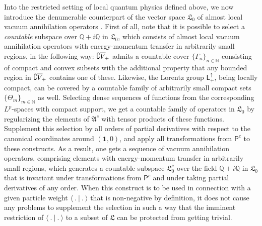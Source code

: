 \documentclass[a4paper,a4paper]{article}
\numberwithin{equation}{section}
\newcommand{\Nbb}{\mathbb{N}}
\newcommand{\Qbb}{\mathbb{Q}}
\newcommand{\Lfrak}{\mathfrak{L}}
\newcommand{\unit}{\mathbf{1}}
\newcommand{\Lor}{\mathsf{L}_+^\uparrow}
\newcommand{\fwcone}{\overline{V}_{\negthinspace +}}
\newcommand{\Pcount}{\mathsf{P}^c}
\newcommand{\Acount}{\mathfrak{A}^c}
\newcommand{\vaccount}{\mathfrak{L}_0^c}
\theoremstyle{definition}
\theoremstyle{plain}
\theoremstyle{remark}
\theoremstyle{assumption}
\newcommand{\set}[1]{\{ #1 \}}
\newcommand{\scp}[2]{\langle #1 \vert #2 \rangle}
\begin{document}
  Into the restricted setting of local quantum physics defined above,
  we now introduce the denumerable counterpart of the vector space
  $\Lfrak_0$ of almost local vacuum annihilation operators
  \cite[Definition~2.3]{porrmann:2002a}. First of all, note that it is
  possible to select a \emph{countable} subspace over $\Qbb + i \Qbb$
  in $\Lfrak_0$, which consists of almost local vacuum annihilation
  operators with energy-momentum transfer in arbitrarily small
  regions, in the following way: $\complement \fwcone$ admits a
  countable cover $\set{\Gamma_n}_{n \in \Nbb}$ consisting of compact
  and convex subsets with the additional property that any bounded
  region in $\complement \fwcone$ contains one of these.  Likewise,
  the Lorentz group $\Lor$, being locally compact, can be covered by a
  countable family of arbitrarily small compact sets
  $\set{\Theta_m}_{m \in \Nbb}$ as well. Selecting dense sequences of
  functions from the corresponding $L^p$-spaces with compact support,
  we get a countable family of operators in $\Lfrak_0$ by regularizing
  the elements of $\Acount$ with tensor products of these functions.
  Supplement this selection by all orders of partial derivatives with
  respect to the canonical coordinates around $( \unit , 0 )$, and
  apply all transformations from $\Pcount$ to these constructs. As a
  result, one gets a sequence of vacuum annihilation operators,
  comprising elements with energy-momentum transfer in arbitrarily
  small regions, which generates a countable subspace $\vaccount$ over
  the field $\Qbb + i \Qbb$ in $\Lfrak_0$ that is invariant under
  transformations from $\Pcount$ and under taking partial derivatives
  of any order. When this construct is to be used in connection with a
  given particle weight $\scp{~.~}{~.~}$ that is non-negative by
  definition, it does not cause any problems to supplement the
  selection in such a way that the imminent restriction of
  $\scp{~.~}{~.~}$ to a subset of $\Lfrak$ can be protected from
  getting trivial.
  
\end{document}
